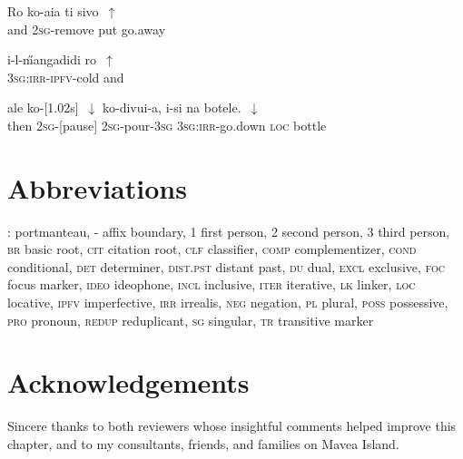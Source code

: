 \documentclass[output=paper]{LSP/langsci}
\begin{document}
  \begin{exe}
\gll     Ro     ko-aia         ti    sivo~$\uparrow$    \\     	       
 and   \textsc{2sg}-remove   put   go.away \\
\glt {} 
\label{Guapp25}
\end{exe}

  \begin{exe}
\gll    i-l-\H{m}angadidi               ro~$\uparrow$  \\     	 
 \textsc{3sg:irr-ipfv}-cold        and\\
\glt {} 
\label{Guapp26}
\end{exe}

  \begin{exe}
 \label{Guapp27}
\gll   ale    ko-[1.02s]~$\downarrow$      ko-divui-a,  i-si                 na   botele.~$\downarrow$  \\     	       
 then   \textsc{2sg}-[pause]      \textsc{2sg}-pour-\textsc{3sg}  \textsc{3sg:irr}-go.down   \textsc{loc}  bottle\\
\glt {} 
\end{exe}



\section*{Abbreviations}
\textsc{:} portmanteau,
\textsc{-} affix boundary,
\textsc{1}		first person,
\textsc{2}		second person,
\textsc{3} 		third person,
\textsc{br}		basic root,
\textsc{cit}		citation root,
\textsc{clf}		classifier,
\textsc{comp}		complementizer,
\textsc{cond}		conditional,
\textsc{det}		determiner,
\textsc{dist.pst}		distant past,
\textsc{du}		dual,
\textsc{excl}		exclusive,
\textsc{foc}		focus marker,
\textsc{ideo}		ideophone,
\textsc{incl}		inclusive,
\textsc{iter}		iterative,
\textsc{lk}		linker,
\textsc{loc}		locative,
\textsc{ipfv}		imperfective,
\textsc{irr} 		irrealis,
\textsc{neg} 		negation,
\textsc{pl} 		plural,
\textsc{poss} 		possessive,
\textsc{pro} 		pronoun,
\textsc{redup} 		reduplicant,
\textsc{sg} 		singular,
\textsc{tr} 		transitive marker




\section*{Acknowledgements}
Sincere thanks to both reviewers whose insightful comments helped improve this chapter, and to my consultants, friends, and families on Mavea Island.
\sloppy

\printbibliography[heading=subbibliography,notkeyword=this] 
\end{document}
